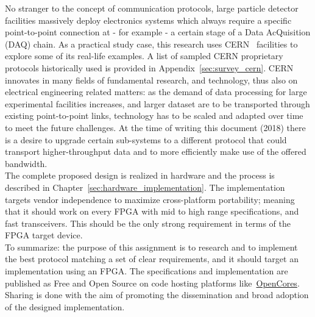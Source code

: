 No stranger to the concept of communication protocols, large particle detector facilities massively deploy electronics systems which always require a specific point-to-point connection at - for example - a certain stage of a Data AcQuisition (DAQ) chain. As a practical study case, this research uses CERN~\cite{CERN} facilities to explore some of its real-life examples. A list of sampled CERN proprietary protocols historically used is provided in Appendix~\ref{sec:survey_cern}. CERN innovates in many fields of fundamental research, and technology, thus also on electrical engineering related matters: as the demand of data processing for large experimental facilities increases, and larger dataset are to be transported through existing point-to-point links, technology has to be scaled and adapted over time to meet the future challenges. At the time of writing this document (2018) there is a desire to upgrade certain sub-systems to a different protocol that could transport higher-throughput data and to more efficiently make use of the offered bandwidth.\\

The complete proposed design is realized in hardware and the process is described in Chapter~\ref{sec:hardware_implementation}. The implementation targets vendor independence to maximize cross-platform portability; meaning that it should work on every FPGA with mid to high range specifications, and fast transceivers. This should be the only strong requirement in terms of the FPGA target device.\\

To summarize: the purpose of this assignment is to research and to implement the best protocol matching a set of clear requirements, and it should target an implementation using an FPGA. The specifications and implementation are published as Free and Open Source on code hosting platforms like~\href{https://opencores.org/}{OpenCores}. Sharing is done with the aim of promoting the dissemination and broad adoption of the designed implementation.

\newpage